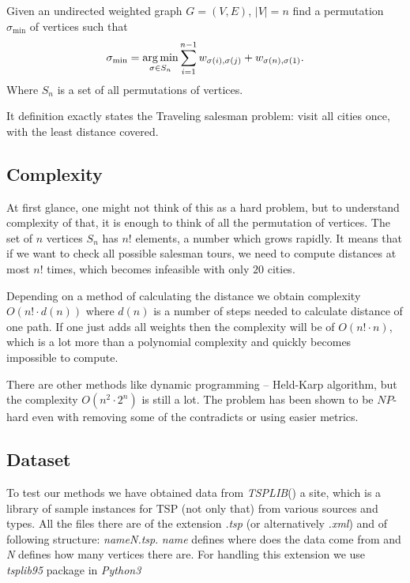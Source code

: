 	\begin{definition}
		Given an undirected weighted graph $G = (V, E)$, $|V| = n$ find a permutation $\sigma_{\min}$ of vertices such that
		\begin{equation*}
			\sigma_{\min} = \underset{\sigma \in S_n}{\operatorname*{arg\,min}} \sum_{i=1}^{n-1} w_{\sigma(i), \sigma(j)} + w_{\sigma(n), \sigma(1)}.
		\end{equation*}
		Where $S_n$ is a set of all permutations of vertices.
	\end{definition}
	It definition exactly states the Traveling salesman problem: visit all cities once, with the least distance covered.
	
\subsection{Complexity}
	At first glance, one might not think of this as a hard problem, but to understand complexity of that, it is enough to think of all the permutation of vertices. The set of $n$ vertices $S_n$ has $n!$ elements, a number which grows rapidly. It means that if we want to check all possible salesman tours, we need to compute distances at most $n!$ times, which becomes infeasible with only $20$ cities. 
	
	Depending on a method of calculating the distance we obtain complexity $O(n! \cdot d(n))$ where $d(n)$ is a number of steps needed to calculate distance of one path. If one just adds all weights then the complexity will be of $O(n! \cdot n)$, which is a lot more than a polynomial complexity and quickly becomes impossible to compute.
	
	There are other methods like dynamic programming -- Held-Karp algorithm, but the complexity $O(n^2 \cdot 2^n)$ is still a lot. The problem has been shown to be $NP$-hard even with removing some of the contradicts or using easier metrics.

\subsection{Dataset}
	To test our methods we have obtained data from \textit{TSPLIB}(\cite{TSPLIB8:online}) a site, which is a library of sample instances for TSP (not only that) from various sources and types. All the files there are of the extension \textit{.tsp} (or alternatively \textit{.xml}) and of following structure: \textit{nameN.tsp}. \textit{name} defines where does the data come from and \textit{N} defines how many vertices there are. For handling this extension we use \textit{tsplib95} package in \textit{Python3}
	
